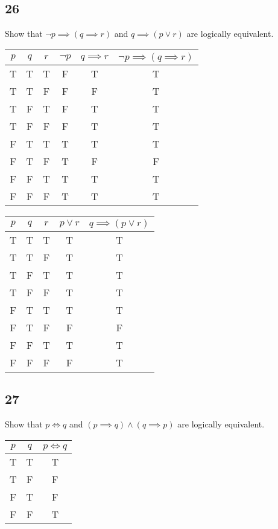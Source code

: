 \documentclass{article}
\begin{document}
\subsection{26}

Show that $ \neg p \implies ( q \implies r ) $ and $ q \implies ( p \lor r ) $ are logically equivalent.

\begin{tabular}{ | c | c | c | c | c | c | }
	$ p $ & $ q $ & $ r $ & $ \neg p $ & $ q \implies r $ & $ \neg p \implies ( q \implies r ) $ \\
	\hline
	T & T & T & F & T & T \\
	T & T & F & F & F & T \\
	T & F & T & F & T & T \\
	T & F & F & F & T & T \\
	F & T & T & T & T & T \\
	F & T & F & T & F & F \\
	F & F & T & T & T & T \\
	F & F & F & T & T & T \\
\end{tabular}

\begin{tabular}{ | c | c | c | c | c | }
	$ p $ & $ q $ & $ r $ & $ p \lor r $ & $ q \implies ( p \lor r ) $ \\
	\hline
	T & T & T & T & T \\
	T & T & F & T & T \\
	T & F & T & T & T \\
	T & F & F & T & T \\
	F & T & T & T & T \\
	F & T & F & F & F \\
	F & F & T & T & T \\
	F & F & F & F & T \\
\end{tabular}

\subsection{27}

Show that $ p \iff q $ and $ ( p \implies q ) \land ( q \implies p ) $ are logically equivalent.

\begin{tabular}{ | c | c | c | }
	$ p $ & $ q $ & $ p \iff q $ \\
	\hline
	T & T & T \\
	T & F & F \\
	F & T & F \\
	F & F & T \\
\end{tabular}
\end{document}
